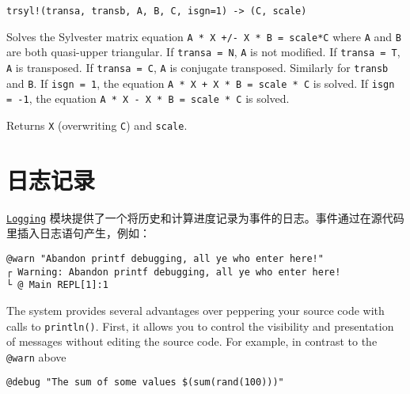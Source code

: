 \begin{adjustwidth}{2em}{0pt}


\begin{verbatim}
trsyl!(transa, transb, A, B, C, isgn=1) -> (C, scale)
\end{verbatim}

Solves the Sylvester matrix equation \texttt{A * X +/- X * B = scale*C} where \texttt{A} and \texttt{B} are both quasi-upper triangular. If \texttt{transa = N}, \texttt{A} is not modified. If \texttt{transa = T}, \texttt{A} is transposed. If \texttt{transa = C}, \texttt{A} is conjugate transposed. Similarly for \texttt{transb} and \texttt{B}. If \texttt{isgn = 1}, the equation \texttt{A * X + X * B = scale * C} is solved. If \texttt{isgn = -1}, the equation \texttt{A * X - X * B = scale * C} is solved.

Returns \texttt{X} (overwriting \texttt{C}) and \texttt{scale}.



\end{adjustwidth}



\hypertarget{16565866334883334127}{}


\chapter{日志记录}



\hyperlink{1488091939099076420}{\texttt{Logging}} 模块提供了一个将历史和计算进度记录为事件的日志。事件通过在源代码里插入日志语句产生，例如：




\begin{verbatim}
@warn "Abandon printf debugging, all ye who enter here!"
┌ Warning: Abandon printf debugging, all ye who enter here!
└ @ Main REPL[1]:1
\end{verbatim}



The system provides several advantages over peppering your source code with calls to \texttt{println()}.  First, it allows you to control the visibility and presentation of messages without editing the source code.  For example, in contrast to the \texttt{@warn} above




\begin{verbatim}
@debug "The sum of some values $(sum(rand(100)))"
\end{verbatim}



